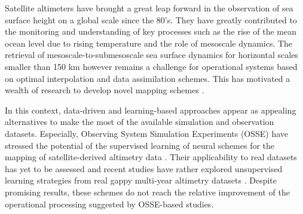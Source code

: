 \documentclass[draft]{agujournal2019}
\begin{document}



  Satellite altimeters have brought a great leap forward in the observation of sea surface height on a global scale since the 80's. They have greatly contributed to the monitoring and understanding of key processes such as the rise of the mean ocean level due to rising temperature and the role of mesoscale dynamics. The retrieval of mesoscale-to-submesoscale sea surface dynamics for horizontal scales smaller than 150 km however remains a challenge for operational systems based on optimal interpolation \cite{taburetDUACSDT2018252019} and data assimilation \cite{jean-michelCopernicusGlobal122021} schemes. This has motivated a wealth of research to develop novel mapping schemes \cite{ballarottaDynamicMappingAlongTrack2020,ubelmannReconstructingOceanSurface2021,guillouMappingAltimetryForthcoming2021}.

  In this context, data-driven and learning-based approaches \cite{alveraazcarateReconstructionIncompleteOceanographic2005,barthDINCAEMultivariateConvolutional2022,lguensatAnalogDataAssimilation2017,fabletENDTOENDPHYSICSINFORMEDREPRESENTATION2021,martinSynthesizingSeaSurface2023} appear as appealing alternatives to make the most of the available simulation and observation datasets. Especially, Observing System Simulation Experiments (OSSE) have stressed the potential of the supervised learning of neural schemes for the mapping of satellite-derived altimetry data \cite{fabletENDTOENDPHYSICSINFORMEDREPRESENTATION2021,beauchamp4DVarNetSSHEndtoendLearning2023}. Their applicability to real datasets has yet to be assessed and recent studies have rather explored unsupervised learning strategies from real gappy multi-year altimetry datasets \cite{martinSynthesizingSeaSurface2023}. Despite promising results, these schemes do not reach the relative improvement of the operational processing suggested by OSSE-based studies.   
  
\end{document}

